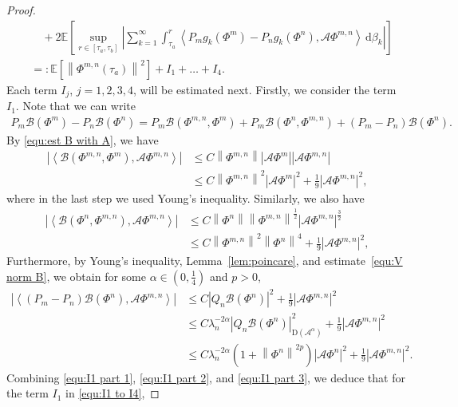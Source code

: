 \documentclass[11pt, reqno]{amsart}
\theoremstyle{definition}
\numberwithin{equation}{section}
\newcommand{\bb}{\mathbb}
\newcommand{\norm}[1]{\left\|{#1}\right\|}
\newcommand{\inpro}[2]{\left\langle#1,#2\right\rangle}
\newcommand{\abs}[1]{\left|{#1}\right|}
\begin{document}
\begin{proof}
\begin{align}
	&\quad
	+
	2 \bb{E} \left[ \sup_{r\in [\tau_a,\tau_b]} \left| \sum_{k=1}^\infty \int_{\tau_a}^r \inpro{P_m g_k(\Phi^m)- P_n g_k(\Phi^n)}{\mathcal{A} \Phi^{m,n}}\, \mathrm{d}\beta_k \right| \right]
	\nonumber\\
	&=: \bb{E}\left[ \norm{\Phi^{m,n}(\tau_a)}^2 \right] +I_1+ \ldots+ I_4.
\end{align}
Each term $I_j$, $j=1,2,3,4$, will be estimated next. Firstly, we consider the term $I_1$. Note that we can write
\begin{align*}
	P_m \mathcal{B}(\Phi^m)- P_n \mathcal{B}(\Phi^n)
	=
	P_m \mathcal{B}(\Phi^{m,n}, \Phi^m) + P_m \mathcal{B}(\Phi^n, \Phi^{m,n}) + (P_m-P_n) \mathcal{B}(\Phi^n).
\end{align*}
By \eqref{equ:est B with A}, we have 
\begin{align}\label{equ:I1 part 1}
	\abs{\inpro{\mathcal{B}(\Phi^{m,n}, \Phi^m)}{\mathcal{A} \Phi^{m,n}}}
	&\leq
	C \norm{\Phi^{m,n}} \abs{\mathcal{A} \Phi^m} \abs{\mathcal{A} \Phi^{m,n}}
	\nonumber\\
	&\leq
	 C \norm{\Phi^{m,n}}^2 \abs{\mathcal{A} \Phi^m}^2 + \frac19 \abs{\mathcal{A} \Phi^{m,n}}^2,
\end{align}
where in the last step we used Young's inequality. Similarly, we also have
\begin{align}\label{equ:I1 part 2}
	\abs{\inpro{\mathcal{B}(\Phi^{n}, \Phi^{m,n})}{\mathcal{A} \Phi^{m,n}}}
	&\leq
	C \norm{\Phi^n} \norm{\Phi^{m,n}}^{\frac12} \abs{\mathcal{A} \Phi^{m,n}}^{\frac32}
	\nonumber\\
	&\leq
	C \norm{\Phi^{m,n}}^2 \norm{\Phi^n}^4 + \frac19 \abs{\mathcal{A} \Phi^{m,n}}^2,
\end{align}
Furthermore, by Young's inequality, Lemma~\ref{lem:poincare}, and estimate~\eqref{equ:V norm B}, we obtain {for some $\alpha\in (0,\frac14)$ and $p>0$},
\begin{align}\label{equ:I1 part 3}
	\abs{\inpro{(P_m-P_n) \mathcal{B}(\Phi^n)}{\mathcal{A} \Phi^{m,n}}}
	&\leq
	C \abs{Q_n \mathcal{B}(\Phi^n)}^2
	+
	\frac19 \abs{\mathcal{A} \Phi^{m,n}}^2 
	\nonumber \\
	&\leq
	C \lambda_n^{-2\alpha} \abs{Q_n \mathcal{B}(\Phi^n)}_{\mathrm{D}(\mathcal{A}^{\alpha})}^2
	+
	\frac19 \abs{\mathcal{A} \Phi^{m,n}}^2 
	\nonumber\\
	&\leq
	C \lambda_n^{-2\alpha} \left(1+\norm{\Phi^n}^{2p}\right) \abs{\mathcal{A}\Phi^n}^2 + \frac19 \abs{\mathcal{A} \Phi^{m,n}}^2.
\end{align}
Combining \eqref{equ:I1 part 1}, \eqref{equ:I1 part 2}, and \eqref{equ:I1 part 3}, we deduce that for the term $I_1$ in \eqref{equ:I1 to I4},

\end{proof}
\end{document}
